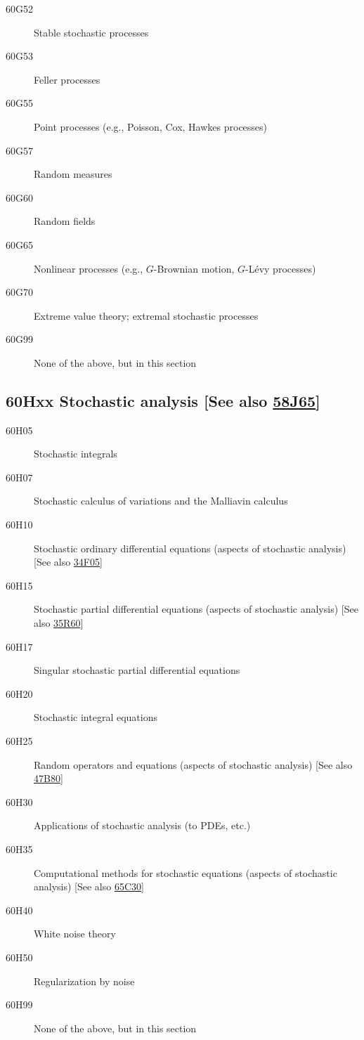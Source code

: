 \begin{description}
\item [60G52]\label{60G52} Stable stochastic processes
\item [60G53]\label{60G53} Feller processes
\item [60G55]\label{60G55} Point processes (e.g., Poisson, Cox, Hawkes processes)
\item [60G57]\label{60G57} Random measures
\item [60G60]\label{60G60} Random fields
\item [60G65]\label{60G65} Nonlinear processes (e.g., $G$-Brownian motion, $G$-L\'{e}vy processes)
\item [60G70]\label{60G70} Extreme value theory; extremal stochastic processes
\item [60G99]\label{60G99} None of the above, but in this section
\end{description}
\subsection*{60Hxx  Stochastic analysis [See also \hyperref[58J65]{58J65}] }\label{60Hxx}
\begin{description}  
\item [60H05]\label{60H05} Stochastic integrals
\item [60H07]\label{60H07} Stochastic calculus of variations and the Malliavin calculus
\item [60H10]\label{60H10} Stochastic ordinary differential equations (aspects of stochastic analysis) [See also \hyperref[34F05]{34F05}]
\item [60H15]\label{60H15} Stochastic partial differential equations (aspects of stochastic analysis) [See also \hyperref[35R60]{35R60}]
\item [60H17]\label{60H17} Singular stochastic partial differential equations
\item [60H20]\label{60H20} Stochastic integral equations
\item [60H25]\label{60H25} Random operators and equations (aspects of stochastic analysis) [See also \hyperref[47B80]{47B80}]
\item [60H30]\label{60H30} Applications of stochastic analysis (to PDEs, etc.)
\item [60H35]\label{60H35} Computational methods for stochastic equations (aspects of stochastic analysis) [See also \hyperref[65C30]{65C30}]
\item [60H40]\label{60H40} White noise theory
\item [60H50]\label{60H50} Regularization by noise
\item [60H99]\label{60H99} None of the above, but in this section
\end{description}
